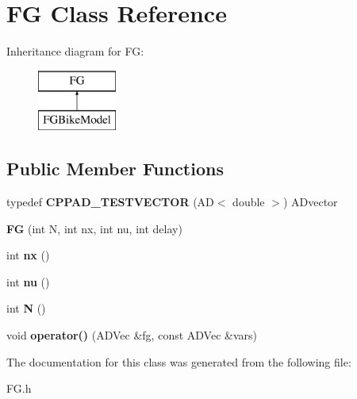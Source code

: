 \hypertarget{classFG}{}\section{FG Class Reference}
\label{classFG}
Inheritance diagram for FG\+:\begin{figure}[H]
\begin{center}
\leavevmode
\includegraphics[height=2.000000cm]{classFG}
\end{center}
\end{figure}
\subsection*{Public Member Functions}
\begin{DoxyCompactItemize}
\item 
\mbox{\label{classFG_a1d0ea758b8e411980defa56ee41e83db}} 
typedef {\bfseries C\+P\+P\+A\+D\+\_\+\+T\+E\+S\+T\+V\+E\+C\+T\+OR} (AD$<$ double $>$) A\+Dvector
\item 
\mbox{\label{classFG_ad8d5b841e141d73f431968357d346047}} 
{\bfseries FG} (int N, int nx, int nu, int delay)
\item 
\mbox{\label{classFG_aef0b4351d9e8a490c453e10d501b5544}} 
int {\bfseries nx} ()
\item 
\mbox{\label{classFG_a20af242c275013b5dda8e07f610f216b}} 
int {\bfseries nu} ()
\item 
\mbox{\label{classFG_ae3dede818b580152a1b1f89518559a96}} 
int {\bfseries N} ()
\item 
\mbox{\label{classFG_a3261eee876229f681c54f8b74b54564f}} 
void {\bfseries operator()} (A\+D\+Vec \&fg, const A\+D\+Vec \&vars)
\end{DoxyCompactItemize}


The documentation for this class was generated from the following file\+:\begin{DoxyCompactItemize}
\item 
F\+G.\+h\end{DoxyCompactItemize}
